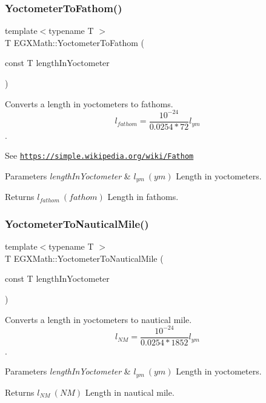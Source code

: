 \subsubsection{\texorpdfstring{Yoctometer\+To\+Fathom()}{YoctometerToFathom()}}
{\footnotesize\ttfamily template$<$typename T $>$ \\
T E\+G\+X\+Math\+::\+Yoctometer\+To\+Fathom (\begin{DoxyParamCaption}\item[{const T}]{length\+In\+Yoctometer }\end{DoxyParamCaption})}



Converts a length in yoctometers to fathoms. \[ l_{fathom}= \frac{10^{-24}}{0.0254 * 72} l_{ym} \]. 

See \href{https://simple.wikipedia.org/wiki/Fathom}{\tt https\+://simple.\+wikipedia.\+org/wiki/\+Fathom} 
\begin{DoxyParams}{Parameters}
{\em length\+In\+Yoctometer} & $ l_{ym}\ (ym)$ Length in yoctometers. \\
\hline
\end{DoxyParams}
\begin{DoxyReturn}{Returns}
$ l_{fathom}\ (fathom)$ Length in fathoms. 
\end{DoxyReturn}
\mbox{\label{group___e_g_x_math-_conversions-_length_conversions-_yoctometer-_nautical_gae49dab08f77667adbef6d419339a54c0}} 
\subsubsection{\texorpdfstring{Yoctometer\+To\+Nautical\+Mile()}{YoctometerToNauticalMile()}}
{\footnotesize\ttfamily template$<$typename T $>$ \\
T E\+G\+X\+Math\+::\+Yoctometer\+To\+Nautical\+Mile (\begin{DoxyParamCaption}\item[{const T}]{length\+In\+Yoctometer }\end{DoxyParamCaption})}



Converts a length in yoctometers to nautical mile. \[ l_{NM}= \frac{10^{-24}}{0.0254 * 1852} l_{ym} \]. 


\begin{DoxyParams}{Parameters}
{\em length\+In\+Yoctometer} & $ l_{ym}\ (ym)$ Length in yoctometers. \\
\hline
\end{DoxyParams}
\begin{DoxyReturn}{Returns}
$ l_{NM}\ (NM)$ Length in nautical mile. 
\end{DoxyReturn}
